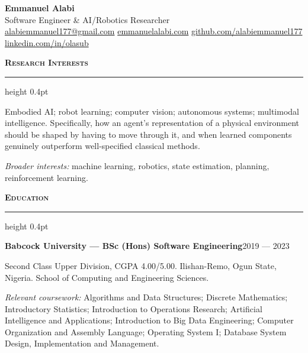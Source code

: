 \documentclass[10pt,a4paper]{article}
\newcommand{\cvsection}[1]{%
  \vspace{0.95em}%
  {\normalsize\bfseries\scshape #1}\par
  \vspace{0.25em}%
  \hrule height 0.4pt
  \vspace{0.6em}%
}
\newcommand{\cventry}[2]{%
  \textbf{#1}\hfill{\small #2}\par\vspace{0.15em}%
}
\begin{document}
\begin{center}
  {\LARGE\bfseries Emmanuel Alabi}\\[0.4em]
  {\small Software Engineer \& AI/Robotics Researcher}\\[0.55em]
  {\small
    \href{mailto:alabiemmanuel177@gmail.com}{alabiemmanuel177@gmail.com}
    \enspace\textbullet\enspace
    \href{https://emmanuelalabi.com}{emmanuelalabi.com}
    \enspace\textbullet\enspace
    \href{https://github.com/alabiemmanuel177}{github.com/alabiemmanuel177}
    \enspace\textbullet\enspace
    \href{https://www.linkedin.com/in/olasub/}{linkedin.com/in/olasub}
  }
\end{center}

\cvsection{Research Interests}

Embodied AI; robot learning; computer vision; autonomous systems; multimodal
intelligence. Specifically, how an agent's representation of a physical
environment should be shaped by having to move through it, and when learned
components genuinely outperform well-specified classical methods.

\vspace{0.4em}
{\small\textit{Broader interests:} machine learning, robotics, state estimation,
planning, reinforcement learning.}

\cvsection{Education}

\cventry{Babcock University --- BSc (Hons) Software Engineering}{2019 --- 2023}
{\small Second Class Upper Division, CGPA 4.00/5.00. Ilishan-Remo, Ogun State,
Nigeria. School of Computing and Engineering Sciences.}

\vspace{0.4em}
{\small\textit{Relevant coursework:} Algorithms and Data Structures; Discrete
Mathematics; Introductory Statistics; Introduction to Operations Research;
Artificial Intelligence and Applications; Introduction to Big Data Engineering;
Computer Organization and Assembly Language; Operating System I; Database System
Design, Implementation and Management.}

\end{document}
